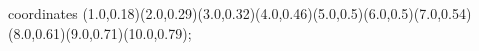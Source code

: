 					coordinates { (1.0,0.18)(2.0,0.29)(3.0,0.32)(4.0,0.46)(5.0,0.5)(6.0,0.5)(7.0,0.54)(8.0,0.61)(9.0,0.71)(10.0,0.79)};